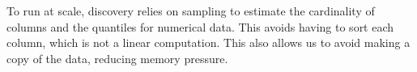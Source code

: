 %
%
%
%
%


To run at scale, discovery relies on sampling to estimate the cardinality of
columns and the quantiles for numerical data. This avoids having to sort each
column, which is not a linear computation.  This also allows us to avoid making
a copy of the data,  reducing memory pressure.

